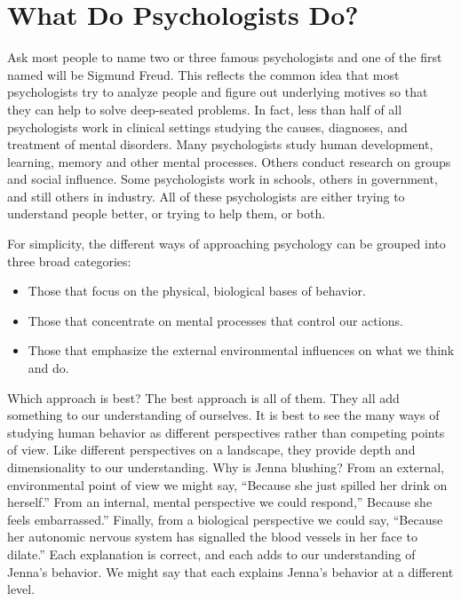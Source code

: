 \documentclass[
]{book}
\providecommand{\tightlist}{%
  \setlength{\itemsep}{0pt}\setlength{\parskip}{0pt}}
\begin{document}
\hypertarget{what-do-psychologists-do}{%
\section{What Do Psychologists Do?}\label{what-do-psychologists-do}}

Ask most people to name two or three famous psychologists and one of the first named will be Sigmund Freud. This reflects the common idea that most psychologists try to analyze people and figure out underlying motives so that they can help to solve deep-seated problems. In fact, less than half of all psychologists work in clinical settings studying the causes, diagnoses, and treatment of mental disorders. Many psychologists study human development, learning, memory and other mental processes. Others conduct research on groups and social influence. Some psychologists work in schools, others in government, and still others in industry. All of these psychologists are either trying to understand people better, or trying to help them, or both.

For simplicity, the different ways of approaching psychology can be grouped into three broad categories:

\begin{itemize}
\tightlist
\item
  Those that focus on the physical, biological bases of behavior.\\
\item
  Those that concentrate on mental processes that control our actions.\\
\item
  Those that emphasize the external environmental influences on what we think and do.
\end{itemize}

Which approach is best? The best approach is all of them. They all add something to our understanding of ourselves. It is best to see the many ways of studying human behavior as different perspectives rather than competing points of view. Like different perspectives on a landscape, they provide depth and dimensionality to our understanding. Why is Jenna blushing? From an external, environmental point of view we might say, ``Because she just spilled her drink on herself.'' From an internal, mental perspective we could respond,'' Because she feels embarrassed.'' Finally, from a biological perspective we could say, ``Because her autonomic nervous system has signalled the blood vessels in her face to dilate.'' Each explanation is correct, and each adds to our understanding of Jenna's behavior. We might say that each explains Jenna's behavior at a different level.
\end{document}

